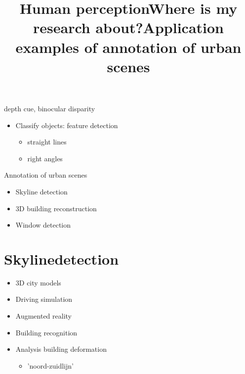 
\title{Human perception}
\item depth cue, binocular disparity


\begin{itemize}
\item Classify objects: feature detection
	\begin{itemize}
		\item straight lines
		\item right angles 
	\end{itemize}
\end{itemize}


\title{Where is my research about?}
\item{Annotation of urban scenes}
	\begin{itemize}
		\item Skyline detection
		\item 3D building reconstruction
		\item Window detection
	\end{itemize}

\section{Skylinedetection}
\title{Application examples of annotation of urban scenes}
\begin{itemize}
	\item 3D city models
	\item Driving simulation
	\item Augmented reality
	\item Building recognition
	\item Analysis building deformation
	\begin{itemize}
		\item 	'noord-zuidlijn'
	\end{itemize}
\end{itemize}


